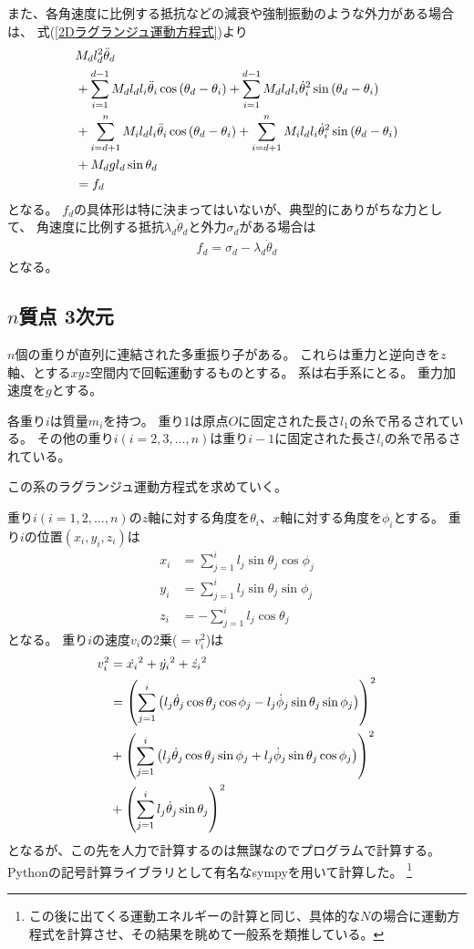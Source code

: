 \documentclass{jsarticle}
\newcommand{\eqa}[1]{\begin{align}#1\end{align}}
\newcommand{\refeq}[1]{式(\ref{#1})}
\newcommand{\cost}[2]{\cos\left(\theta_{#1}-\theta_{#2}\right)}
\newcommand{\sint}[2]{\sin\left(\theta_{#1}-\theta_{#2}\right)}
\newcommand{\dott}[1]{\dot{\theta}_{#1}}
\newcommand{\dotp}[1]{\dot{\phi}_{#1}}
\newcommand{\ddott}[1]{\ddot{\theta}_{#1}}
\begin{document}
また、各角速度に比例する抵抗などの減衰や強制振動のような外力がある場合は、
\refeq{2Dラグランジュ運動方程式}より
\eqa{
	&M_d l_d^2 \ddott{d} \notag\\
		&+ \sum_{i=1}^{d-1} M_d l_d l_i \ddott{i} \cost{d}{i}
			+ \sum_{i=1}^{d-1} M_d l_d l_i \dott{i}^2 \sint{d}{i} \notag\\
		&+ \sum_{i=d+1}^n M_i l_d l_i \ddott{i} \cost{d}{i}
			+ \sum_{i=d+1}^n M_i l_d l_i \dott{i}^2 \sint{d}{i} \notag\\
		&+ M_d g l_d \sin\theta_d \notag\\
	&= f_d
}
となる。
$f_d$の具体形は特に決まってはいないが、典型的にありがちな力として、
角速度に比例する抵抗$\lambda_d \dott{d}$と外力$\sigma_d$がある場合は
\eqa{
	f_d = \sigma_d - \lambda_d \dott{d}
}
となる。


\subsection{$n$質点 3次元}

$n$個の重りが直列に連結された多重振り子がある。
これらは重力と逆向きを$z$軸、とする$xyz$空間内で回転運動するものとする。
系は右手系にとる。
重力加速度を$g$とする。

各重り$i$は質量$m_i$を持つ。
重り$1$は原点$O$に固定された長さ$l_1$の糸で吊るされている。
その他の重り$i(i=2,3,\dots,n)$は重り$i-1$に固定された長さ$l_i$の糸で吊るされている。

この系のラグランジュ運動方程式を求めていく。

重り$i(i=1,2,\dots,n)$の$z$軸に対する角度を$\theta_i$、$x$軸に対する角度を$\phi_i$とする。
重り$i$の位置$(x_i, y_i, z_i)$は
\eqa{
	x_i &= \sum_{j=1}^i l_j \sin\theta_j \cos\phi_j \\
	y_i &= \sum_{j=1}^i l_j \sin\theta_j \sin\phi_j \\
	z_i &= -\sum_{j=1}^i l_j \cos\theta_j
}
となる。
重り$i$の速度$v_i$の2乗($=v_i^2$)は
\eqa{
	v_i^2 &= \dot{x_i}^2 + \dot{y_i}^2 + \dot{z_i}^2 \notag\\
		&= \left(\sum_{j=1}^i \left( l_j \dott{j} \cos\theta_j \cos\phi_j - l_j \dotp{j} \sin\theta_j \sin\phi_j \right) \right)^2 \notag\\
		&+ \left(\sum_{j=1}^i \left( l_j \dott{j} \cos\theta_j \sin\phi_j + l_j \dotp{j} \sin\theta_j \cos\phi_j \right) \right)^2 \notag\\
		&+ \left(\sum_{j=1}^i l_j \dott{j} \sin\theta_j \right)^2 \notag
}
となるが、この先を人力で計算するのは無謀なのでプログラムで計算する。
Pythonの記号計算ライブラリとして有名なsympyを用いて計算した。
\footnote{この後に出てくる運動エネルギーの計算と同じ、具体的な$N$の場合に運動方程式を計算させ、その結果を眺めて一般系を類推している。}
\end{document}
